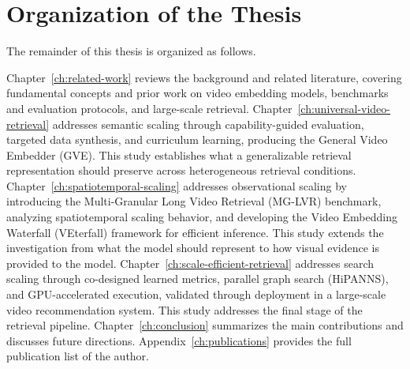 \section{Organization of the Thesis}\label{sec:intro-organization}

The remainder of this thesis is organized as follows.

Chapter~\ref{ch:related-work} reviews the background and related literature, covering fundamental concepts and prior work on video embedding models, benchmarks and evaluation protocols, and large-scale retrieval.
Chapter~\ref{ch:universal-video-retrieval} addresses semantic scaling through capability-guided evaluation, targeted data synthesis, and curriculum learning, producing the General Video Embedder (GVE). This study establishes what a generalizable retrieval representation should preserve across heterogeneous retrieval conditions.
Chapter~\ref{ch:spatiotemporal-scaling} addresses observational scaling by introducing the Multi-Granular Long Video Retrieval (MG-LVR) benchmark, analyzing spatiotemporal scaling behavior, and developing the Video Embedding Waterfall (VEterfall) framework for efficient inference. This study extends the investigation from what the model should represent to how visual evidence is provided to the model.
Chapter~\ref{ch:scale-efficient-retrieval} addresses search scaling through co-designed learned metrics, parallel graph search (HiPANNS), and GPU-accelerated execution, validated through deployment in a large-scale video recommendation system. This study addresses the final stage of the retrieval pipeline.
Chapter~\ref{ch:conclusion} summarizes the main contributions and discusses future directions. Appendix~\ref{ch:publications} provides the full publication list of the author.
